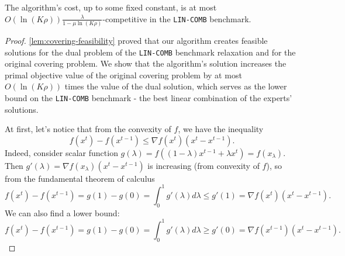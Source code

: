 \begin{theorem} \label{covering-theorem}
The algorithm's cost, up to some fixed constant, is at most $O(\ln(K \rho)) \frac{\lambda}{1 - \mu \ln (K\rho)}$-competitive in the \texttt{LIN-COMB} benchmark.
\end{theorem}
%
\begin{proof} \cref{lem:covering-feasibility} proved that our algorithm creates feasible solutions for the dual problem of the \texttt{LIN-COMB} benchmark relaxation and for the original covering problem. We show that the algorithm's solution increases the primal objective value of the original covering problem by at most $O(\ln(K \rho))$ times the value of the dual solution, which serves as the lower bound on the \texttt{LIN-COMB} benchmark - the best linear combination of the experts' solutions.

At first, let's notice that from the convexity of $f$, we have the inequality
\[f(x^{t}) - f(x^{t-1}) \le \nabla f(x^{t})(x^{t} - x^{t-1}).\]
Indeed, consider scalar function $g(\lambda) = f((1-\lambda)x^{t-1} + \lambda x^{t}) = f(x_{\lambda})$. Then $g'(\lambda) = \nabla f(x_{\lambda})(x^{t} - x^{t-1})$ is increasing (from convexity of $f$), so from the fundamental theorem of calculus
\[f(x^{t}) - f(x^{t-1}) = g(1) - g(0) = \int_{0}^{1}g'(\lambda)d\lambda \le g'(1) = \nabla f(x^{t})(x^{t} - x^{t-1}).\]
We can also find a lower bound:
\begin{equation}\label{eq:derivative_bound}
  f(x^{t}) - f(x^{t-1}) = g(1) - g(0) = \int_{0}^{1}g'(\lambda)d\lambda \ge g'(0) = \nabla f(x^{t-1})(x^{t} - x^{t-1}).
\end{equation}


\end{proof}
